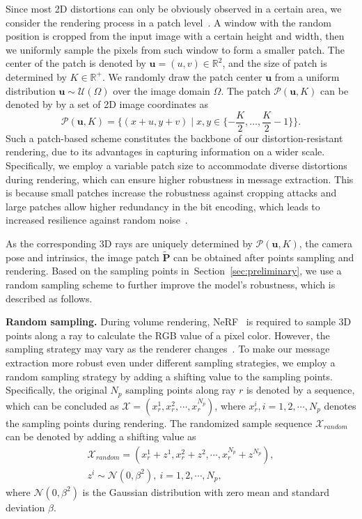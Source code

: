 \documentclass[10pt,twocolumn,letterpaper]{article}
\newcommand{\Sref}[1]{Section~\ref{#1}}
\begin{document}
Since most 2D distortions can only be obviously observed in a certain area, we consider the rendering process in a patch level~\cite{kwon2003watermarking, cotting2004robust}. A window with the random position is cropped from the input image with a certain height and width, then we uniformly sample the pixels from such window to form a smaller patch. The center of the patch is denoted by $\mathbf{u}=(u, v) \in \mathbb{R}^2$, and the size of patch is determined by $K\in \mathbb{R}^{+}$. We randomly draw the patch center $\mathbf{u}$ from a uniform distribution $\mathbf{u} \sim \mathcal{U}(\Omega)$ over the image domain $\Omega$. The patch $\mathcal{P}(\mathbf{u}, K)$ can be denoted by by a set of 2D image coordinates as
\begin{equation}
\mathcal{P}(\mathbf{u}, K)=\{(x+u, y+v) \mid x, y \in\{-\frac{K}{2}, \ldots, \frac{K}{2}-1\}\}.
\end{equation}
Such a patch-based scheme constitutes the backbone of our distortion-resistant rendering, due to its advantages in capturing information on a wider scale. Specifically, we employ a variable patch size to accommodate diverse distortions during rendering, which can ensure higher robustness in message extraction. This is because small patches increase the robustness against cropping attacks and large patches allow higher redundancy in the bit encoding, which leads to increased resilience against random noise~\cite{cotting2004robust}.

As the corresponding 3D rays are uniquely determined by $\mathcal{P}(\mathbf{u}, K)$, the camera pose and intrinsics, the image patch $\widetilde{\mathbf{P}}$ can be obtained after points sampling and rendering. Based on the sampling points in~\Sref{sec:preliminary}, we use a random sampling scheme to further improve the model's robustness, which is described as follows.

\noindent\textbf{Random sampling.} During volume rendering, NeRF~\cite{nerf2020} is required to sample 3D points along a ray to calculate the RGB value of a pixel color. However, the sampling strategy may vary as the renderer changes~\cite{neff2021donerf, lindell2021autoint}. To make our message extraction more robust even under different sampling strategies, we employ a random sampling strategy by adding a shifting value to the sampling points. Specifically, the original $N_p$ sampling points along ray $r$ is denoted by a sequence, which can be concluded as $\mathcal{X} = (x_r^1, x_r^2, \cdots, x_r^{N_p})$, where $x_r^{i},  i = 1, 2, \cdots, N_p$ denotes the sampling points during rendering. The randomized sample sequence $\mathcal{X}_{random}$ can be denoted by adding a shifting value as
\begin{equation}
\begin{aligned}
\mathcal{X}_{random} = (x_r^1 + z^1, x_r^2 + z^2, \cdots, x_r^{N_p} + z^{N_p}),\\
z^i \sim \mathcal{N}(0, \beta^2),\ i=1,2, \cdots, N_p,
\end{aligned}
\end{equation}
where $\mathcal{N}(0, \beta^2)$ is the Gaussian distribution with zero mean and standard deviation $\beta$.
\end{document}
